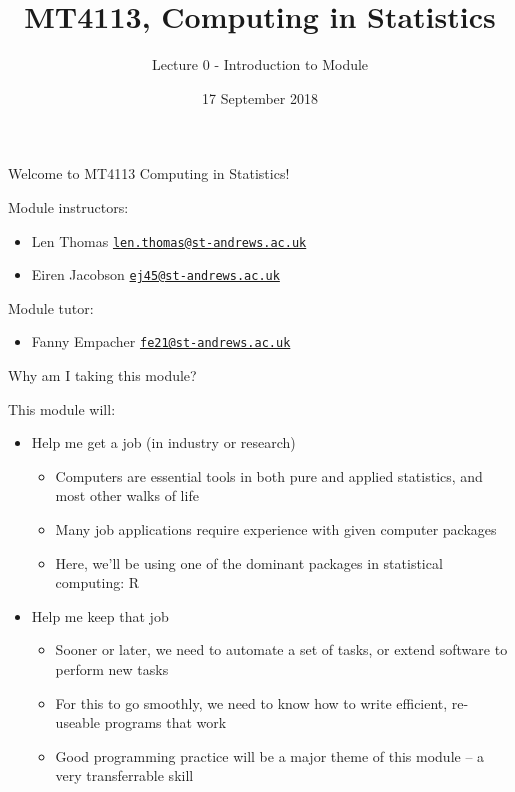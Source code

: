 \documentclass[ignorenonframetext,]{beamer}
\title{MT4113, Computing in Statistics}
\author{Lecture 0 - Introduction to Module}
\date{17 September 2018}
\providecommand{\tightlist}{%
  \setlength{\itemsep}{0pt}\setlength{\parskip}{0pt}}
\begin{document}
\frame{\titlepage}

\begin{frame}{Welcome to MT4113 Computing in Statistics!}

Module instructors:

\begin{itemize}[<+->]
\tightlist
\item
  Len Thomas
  \href{mailto:len.thomas@st-andrews.ac.uk}{\nolinkurl{len.thomas@st-andrews.ac.uk}}
\item
  Eiren Jacobson
  \href{mailto:ej45@st-andrews.ac.uk}{\nolinkurl{ej45@st-andrews.ac.uk}}
\end{itemize}

Module tutor:

\begin{itemize}[<+->]
\tightlist
\item
  Fanny Empacher
  \href{mailto:fe21@st-andrews.ac.uk}{\nolinkurl{fe21@st-andrews.ac.uk}}
\end{itemize}

\end{frame}

\begin{frame}{Why am I taking this module?}

This module will:

\begin{itemize}[<+->]
\tightlist
\item
  Help me get a job (in industry or research)

  \begin{itemize}[<+->]
  \tightlist
  \item
    Computers are essential tools in both pure and applied statistics,
    and most other walks of life
  \item
    Many job applications require experience with given computer
    packages
  \item
    Here, we'll be using one of the dominant packages in statistical
    computing: R
  \end{itemize}
\end{itemize}

\end{frame}

\begin{frame}

\begin{itemize}[<+->]
\tightlist
\item
  Help me keep that job

  \begin{itemize}[<+->]
  \tightlist
  \item
    Sooner or later, we need to automate a set of tasks, or extend
    software to perform new tasks
  \item
    For this to go smoothly, we need to know how to write efficient,
    re-useable programs that work
  \item
    Good programming practice will be a major theme of this module -- a
    very transferrable skill
  \end{itemize}
\end{itemize}

\end{frame}
\end{document}
